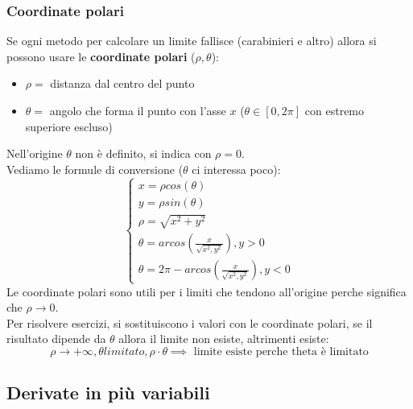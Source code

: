 \documentclass[12pt,a4paper]{article}
\begin{document}
\subsubsection{Coordinate polari}
Se ogni metodo per calcolare un limite fallisce (carabinieri e altro) allora si possono usare le \textbf{coordinate polari} ($\rho,\theta$):
\begin{itemize}
  \item $\rho = $ distanza dal centro del punto
  \item $\theta = $ angolo che forma il punto con l'asse $x$ ($\theta \in [0,2\pi]$ con estremo superiore escluso)
\end{itemize}
Nell'origine $\theta$ non è definito, si indica con $\rho = 0$.\\
Vediamo le formule di conversione ($\theta$ ci interessa poco):
\[
\begin{cases}
  x = \rho cos(\theta)\\
  y = \rho sin(\theta)\\
  \rho = \sqrt{x^2 + y^2}\\
  \theta = arcos(\frac{x}{\sqrt{x^2,y^2}}), y > 0\\
  \theta = 2\pi - arcos(\frac{x}{\sqrt{x^2,y^2}}), y < 0
\end{cases}
\]
Le coordinate polari sono utili per i limiti che tendono all'origine perche significa che $\rho \to 0$.\\
Per risolvere esercizi, si sostituiscono i valori con le coordinate polari, se il risultato dipende da $\theta$ allora il limite non esiste, altrimenti esiste:
\[
\rho \to +\infty, \theta limitato, \rho \cdot \theta \implies \text{ limite esiste perche theta è limitato}
\]

\subsection{Derivate in più variabili}
\end{document}
